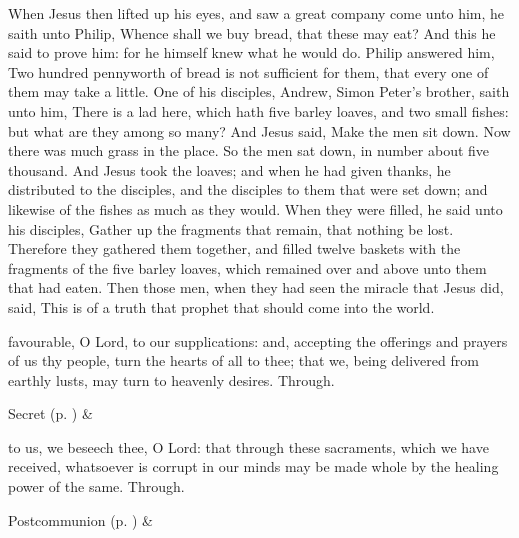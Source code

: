 \clearpage
{}
 When Jesus then lifted up his eyes, and saw a great company come unto him, he saith unto Philip, Whence shall we buy bread, that these may eat? And this he said to prove him: for he himself knew what he would do. Philip answered him, Two hundred pennyworth of bread is not sufficient for them, that every one of them may take a little. One of his disciples, Andrew, Simon Peter's brother, saith unto him, There is a lad here, which hath five barley loaves, and two small fishes: but what are they among so many? And Jesus said, Make the men sit down. Now there was much grass in the place. So the men sat down, in number about five thousand. And Jesus took the loaves; and when he had given thanks, he distributed to the disciples, and the disciples to them that were set down; and likewise of the fishes as much as they would. When they were filled, he said unto his disciples, Gather up the fragments that remain, that nothing be lost. Therefore they gathered them together, and filled twelve baskets with the fragments of the five barley loaves, which remained over and above unto them that had eaten. Then those men, when they had seen the miracle that Jesus did, said, This is of a truth that prophet that should come into the world.


\secret
{} favourable, O Lord, to our supplications: and, accepting the offerings and prayers of us thy people, turn the hearts of all to thee; that we, being delivered from earthly lusts, may turn to heavenly desires. Through.

\begin{rubric}
     Secret  (p. \pageref{SPSaints}) \&  
\end{rubric}


\postcommunion
{} to us, we beseech thee, O Lord: that through these sacraments, which we have received, whatsoever is corrupt in our minds may be made whole by the healing power of the same. Through.

\begin{rubric}
     Postcommunion  (p. \pageref{SPSaints}) \&  
\end{rubric}